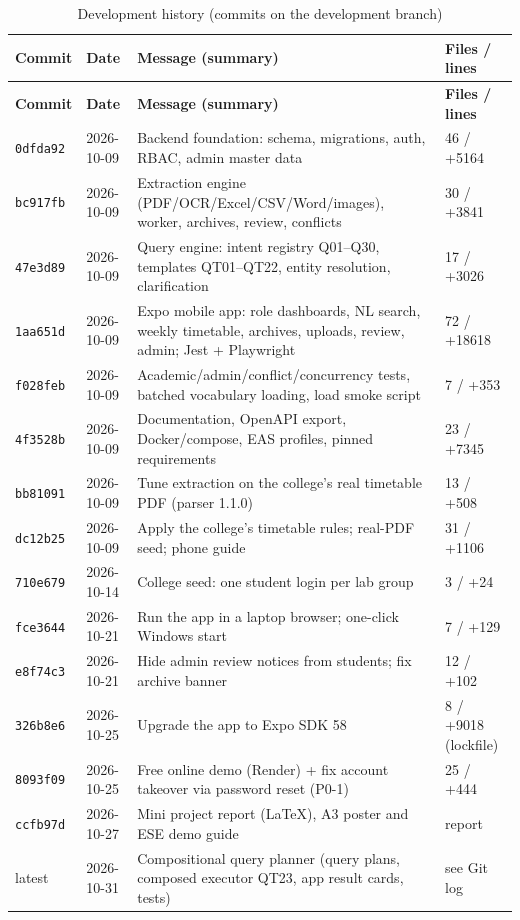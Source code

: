 \begingroup\small
\begin{longtable}{@{}p{1.5cm}p{1.9cm}p{9.0cm}p{2.3cm}@{}}
\caption{Development history (commits on the development branch)}\label{tab:commits}\\
\toprule
\textbf{Commit} & \textbf{Date} & \textbf{Message (summary)} & \textbf{Files / lines}\\
\midrule
\endfirsthead
\toprule
\textbf{Commit} & \textbf{Date} & \textbf{Message (summary)} & \textbf{Files / lines}\\
\midrule
\endhead
\texttt{0dfda92} & 2026-10-09 & Backend foundation: schema, migrations, auth, RBAC, admin master data & 46 / +5164\\
\texttt{bc917fb} & 2026-10-09 & Extraction engine (PDF/OCR/Excel/CSV/Word/images), worker, archives, review, conflicts & 30 / +3841\\
\texttt{47e3d89} & 2026-10-09 & Query engine: intent registry Q01--Q30, templates QT01--QT22, entity resolution, clarification & 17 / +3026\\
\texttt{1aa651d} & 2026-10-09 & Expo mobile app: role dashboards, NL search, weekly timetable, archives, uploads, review, admin; Jest + Playwright & 72 / +18618\\
\texttt{f028feb} & 2026-10-09 & Academic/admin/conflict/concurrency tests, batched vocabulary loading, load smoke script & 7 / +353\\
\texttt{4f3528b} & 2026-10-09 & Documentation, OpenAPI export, Docker/compose, EAS profiles, pinned requirements & 23 / +7345\\
\texttt{bb81091} & 2026-10-09 & Tune extraction on the college's real timetable PDF (parser 1.1.0) & 13 / +508\\
\texttt{dc12b25} & 2026-10-09 & Apply the college's timetable rules; real-PDF seed; phone guide & 31 / +1106\\
\texttt{710e679} & 2026-10-14 & College seed: one student login per lab group & 3 / +24\\
\texttt{fce3644} & 2026-10-21 & Run the app in a laptop browser; one-click Windows start & 7 / +129\\
\texttt{e8f74c3} & 2026-10-21 & Hide admin review notices from students; fix archive banner & 12 / +102\\
\texttt{326b8e6} & 2026-10-25 & Upgrade the app to Expo SDK 58 & 8 / +9018 (lockfile)\\
\texttt{8093f09} & 2026-10-25 & Free online demo (Render) + fix account takeover via password reset (P0-1) & 25 / +444\\
\texttt{ccfb97d} & 2026-10-27 & Mini project report (LaTeX), A3 poster and ESE demo guide & report\\
latest & 2026-10-31 & Compositional query planner (query plans, composed executor QT23, app result cards, tests) & see Git log\\
\bottomrule
\end{longtable}
\endgroup

